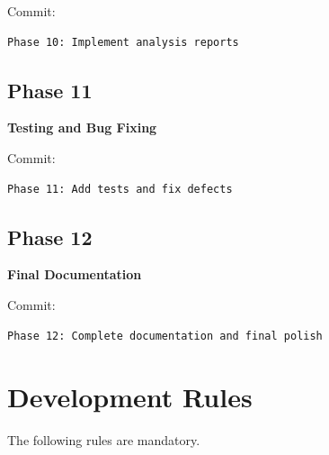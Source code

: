 \documentclass[12pt,a4paper]{article}
\begin{document}
Commit:

\begin{verbatim}
Phase 10: Implement analysis reports
\end{verbatim}

\subsection{Phase 11}

\textbf{Testing and Bug Fixing}

Commit:

\begin{verbatim}
Phase 11: Add tests and fix defects
\end{verbatim}

\subsection{Phase 12}

\textbf{Final Documentation}

Commit:

\begin{verbatim}
Phase 12: Complete documentation and final polish
\end{verbatim}


\section{Development Rules}

The following rules are mandatory.
\end{document}
